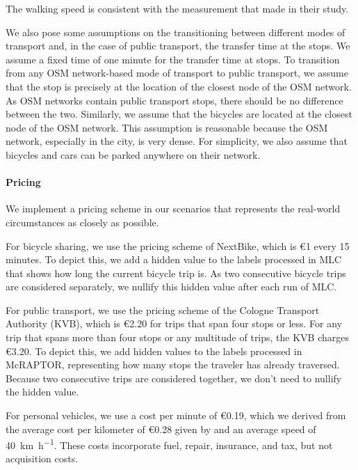 The walking speed is consistent with the measurement that  made in their study.

We also pose some assumptions on the transitioning between different modes of transport and, in the case of public transport, the transfer time at the stops.
We assume a fixed time of one minute for the transfer time at stops.
To transition from any OSM network-based mode of transport to public transport, we assume that the stop is precisely at the location of the closest node of the OSM network.
As OSM networks contain public transport stops, there should be no difference between the two.
Similarly, we assume that the bicycles are located at the closest node of the OSM network.
This assumption is reasonable because the OSM network, especially in the city, is very dense.
For simplicity, we also assume that bicycles and cars can be parked anywhere on their network.


\paragraph{Pricing}

We implement a pricing scheme in our scenarios that represents the real-world circumstances as closely as possible.

For bicycle sharing, we use the pricing scheme of NextBike, which is \euro{1} every 15 minutes.
To depict this, we add a hidden value to the labels processed in MLC that shows how long the current bicycle trip is.
As two consecutive bicycle trips are considered separately, we nullify this hidden value after each run of MLC.

For public transport, we use the pricing scheme of the Cologne Transport Authority (KVB), which is \euro{2.20} for trips that span four stops or less.
For any trip that spans more than four stops or any multitude of trips, the KVB charges \euro{3.20}.
To depict this, we add hidden values to the labels processed in McRAPTOR, representing how many stops the traveler has already traversed.
Because two consecutive trips are considered together, we don't need to nullify the hidden value.

For personal vehicles, we use a cost per minute of \euro{0.19}, which we derived from the average cost per kilometer of \euro{0.28} given by \cite{kieferSpritkostenrechner2023} and an average speed of \SI{40}{\kilo\meter\per\hour}.
These costs incorporate fuel, repair, insurance, and tax, but not acquisition costs.


